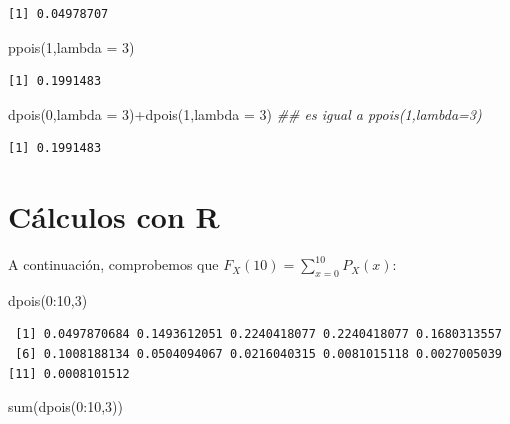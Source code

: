 \documentclass[
  letterpaper,
  DIV=11,
  numbers=noendperiod]{scrreprt}
\newenvironment{Shaded}{\begin{snugshade}}{\end{snugshade}}
\newcommand{\AttributeTok}[1]{\textcolor[rgb]{0.40,0.45,0.13}{#1}}
\newcommand{\DecValTok}[1]{\textcolor[rgb]{0.68,0.00,0.00}{#1}}
\newcommand{\DocumentationTok}[1]{\textcolor[rgb]{0.37,0.37,0.37}{\textit{#1}}}
\newcommand{\FunctionTok}[1]{\textcolor[rgb]{0.28,0.35,0.67}{#1}}
\newcommand{\NormalTok}[1]{\textcolor[rgb]{0.00,0.23,0.31}{#1}}
\newcommand{\SpecialCharTok}[1]{\textcolor[rgb]{0.37,0.37,0.37}{#1}}
\begin{document}
\begin{verbatim}
[1] 0.04978707
\end{verbatim}

\begin{Shaded}
\begin{Highlighting}[]
\FunctionTok{ppois}\NormalTok{(}\DecValTok{1}\NormalTok{,}\AttributeTok{lambda =} \DecValTok{3}\NormalTok{)}
\end{Highlighting}
\end{Shaded}

\begin{verbatim}
[1] 0.1991483
\end{verbatim}

\begin{Shaded}
\begin{Highlighting}[]
\FunctionTok{dpois}\NormalTok{(}\DecValTok{0}\NormalTok{,}\AttributeTok{lambda =} \DecValTok{3}\NormalTok{)}\SpecialCharTok{+}\FunctionTok{dpois}\NormalTok{(}\DecValTok{1}\NormalTok{,}\AttributeTok{lambda =} \DecValTok{3}\NormalTok{) }\DocumentationTok{\#\# es igual a ppois(1,lambda=3)}
\end{Highlighting}
\end{Shaded}

\begin{verbatim}
[1] 0.1991483
\end{verbatim}

\section{Cálculos con R}\label{cuxe1lculos-con-r-6}

A continuación, comprobemos que
\(F_X(10)=\sum\limits_{x=0}^{10} P_X(x)\):

\begin{Shaded}
\begin{Highlighting}[]
\FunctionTok{dpois}\NormalTok{(}\DecValTok{0}\SpecialCharTok{:}\DecValTok{10}\NormalTok{,}\DecValTok{3}\NormalTok{)}
\end{Highlighting}
\end{Shaded}

\begin{verbatim}
 [1] 0.0497870684 0.1493612051 0.2240418077 0.2240418077 0.1680313557
 [6] 0.1008188134 0.0504094067 0.0216040315 0.0081015118 0.0027005039
[11] 0.0008101512
\end{verbatim}

\begin{Shaded}
\begin{Highlighting}[]
\FunctionTok{sum}\NormalTok{(}\FunctionTok{dpois}\NormalTok{(}\DecValTok{0}\SpecialCharTok{:}\DecValTok{10}\NormalTok{,}\DecValTok{3}\NormalTok{))}
\end{Highlighting}
\end{Shaded}
\end{document}
